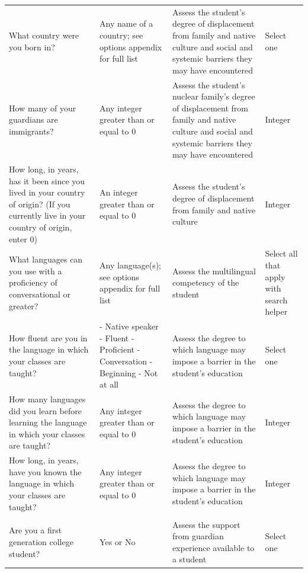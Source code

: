 \documentclass[10pt, twocolumn]{article}
\begin{document}
\begin{xltabular}{\textwidth}{|p{0.3\textwidth}|p{0.3\textwidth}|p{0.2\textwidth}|X|}
    \hline 
     \\ \hline
    What country were you born in? & Any name of a country; see options appendix for full list & Assess the student's degree of displacement from family and native culture and social and systemic barriers they may have encountered & Select one \\ \hline 
    How many of your guardians are immigrants? & Any integer greater than or equal to 0 & Assess the student's nuclear family's degree of displacement from family and native culture and social and systemic barriers they may have encountered & Integer \\ \hline
    How long, in years, has it been since you lived in your country of origin? (If you currently live in your country of origin, enter 0) & An integer greater than or equal to 0 & Assess the student's degree of displacement from family and native culture & Integer \\ \hline 
    What languages can you use with a proficiency of conversational or greater? & Any language(s); see options appendix for full list & Assess the multilingual competency of the student & Select all that apply with search helper \\ \hline 
    How fluent are you in the language in which your classes are taught? & - Native speaker \newline - Fluent \newline - Proficient \newline - Conversation \newline - Beginning \newline - Not at all & Assess the degree to which language may impose a barrier in the student's education & Select one \\ \hline 
    How many languages did you learn before learning the language in which your classes are taught? & Any integer greater than or equal to 0 & Assess the degree to which language may impose a barrier in the student's education & Integer \\ \hline 
    How long, in years, have you known the language in which your classes are taught? & Any integer greater than or equal to 0 & Assess the degree to which language may impose a barrier in the student's education & Integer \\ \hline 
     \\ \hline
    Are you a first generation college student? & Yes or No & Assess the support from guardian experience available to a student & Select one \\ \hline 

\end{xltabular}
\end{document}
